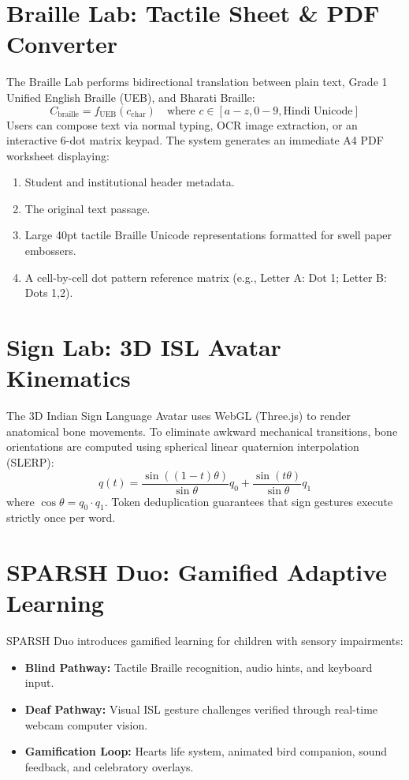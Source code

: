 \documentclass[12pt,a4paper]{report}
\begin{document}
\section{Braille Lab: Tactile Sheet \& PDF Converter}
The Braille Lab performs bidirectional translation between plain text, Grade 1 Unified English Braille (UEB), and Bharati Braille:
\begin{equation}
    C_{\text{braille}} = f_{\text{UEB}}(c_{\text{char}}) \quad \text{where } c \in [a-z, 0-9, \text{Hindi Unicode}]
\end{equation}
Users can compose text via normal typing, OCR image extraction, or an interactive 6-dot matrix keypad. The system generates an immediate A4 PDF worksheet displaying:
\begin{enumerate}
    \item Student and institutional header metadata.
    \item The original text passage.
    \item Large 40pt tactile Braille Unicode representations formatted for swell paper embossers.
    \item A cell-by-cell dot pattern reference matrix (e.g., Letter A: Dot 1; Letter B: Dots 1,2).
\end{enumerate}

\section{Sign Lab: 3D ISL Avatar Kinematics}
The 3D Indian Sign Language Avatar uses WebGL (Three.js) to render anatomical bone movements. To eliminate awkward mechanical transitions, bone orientations are computed using spherical linear quaternion interpolation (SLERP):
\begin{equation}
    q(t) = \frac{\sin((1-t)\theta)}{\sin\theta} q_0 + \frac{\sin(t\theta)}{\sin\theta} q_1
\end{equation}
where $\cos\theta = q_0 \cdot q_1$. Token deduplication guarantees that sign gestures execute strictly once per word.

\section{SPARSH Duo: Gamified Adaptive Learning}
SPARSH Duo introduces gamified learning for children with sensory impairments:
\begin{itemize}
    \item \textbf{Blind Pathway:} Tactile Braille recognition, audio hints, and keyboard input.
    \item \textbf{Deaf Pathway:} Visual ISL gesture challenges verified through real-time webcam computer vision.
    \item \textbf{Gamification Loop:} Hearts life system, animated bird companion, sound feedback, and celebratory overlays.
\end{itemize}
\end{document}
